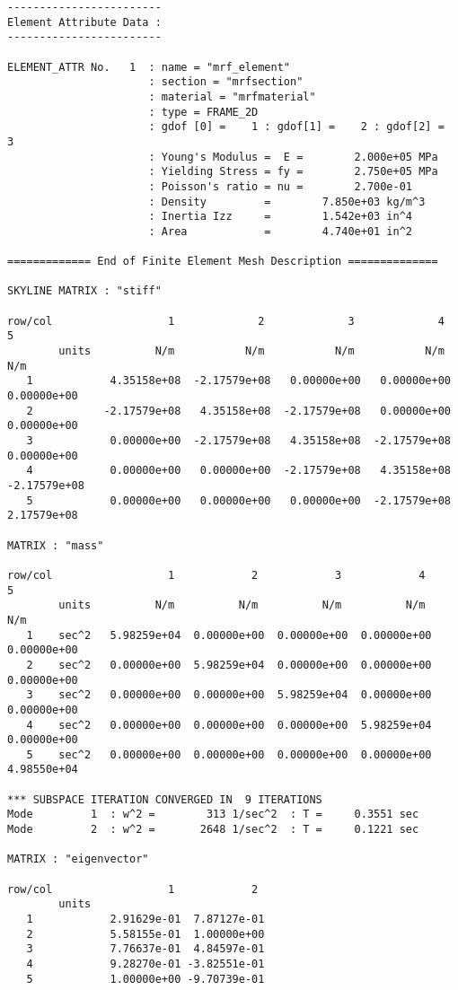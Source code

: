 \begin{footnotesize}
\begin{verbatim}
------------------------ 
Element Attribute Data :        
------------------------ 

ELEMENT_ATTR No.   1  : name = "mrf_element" 
                      : section = "mrfsection" 
                      : material = "mrfmaterial" 
                      : type = FRAME_2D
                      : gdof [0] =    1 : gdof[1] =    2 : gdof[2] =    3
                      : Young's Modulus =  E =        2.000e+05 MPa
                      : Yielding Stress = fy =        2.750e+05 MPa
                      : Poisson's ratio = nu =        2.700e-01   
                      : Density         =        7.850e+03 kg/m^3
                      : Inertia Izz     =        1.542e+03 in^4
                      : Area            =        4.740e+01 in^2

============= End of Finite Element Mesh Description ==============

SKYLINE MATRIX : "stiff"

row/col                  1             2             3             4             5   
        units          N/m           N/m           N/m           N/m           N/m   
   1            4.35158e+08  -2.17579e+08   0.00000e+00   0.00000e+00   0.00000e+00 
   2           -2.17579e+08   4.35158e+08  -2.17579e+08   0.00000e+00   0.00000e+00 
   3            0.00000e+00  -2.17579e+08   4.35158e+08  -2.17579e+08   0.00000e+00 
   4            0.00000e+00   0.00000e+00  -2.17579e+08   4.35158e+08  -2.17579e+08 
   5            0.00000e+00   0.00000e+00   0.00000e+00  -2.17579e+08   2.17579e+08 

MATRIX : "mass"

row/col                  1            2            3            4            5   
        units          N/m          N/m          N/m          N/m          N/m   
   1    sec^2   5.98259e+04  0.00000e+00  0.00000e+00  0.00000e+00  0.00000e+00
   2    sec^2   0.00000e+00  5.98259e+04  0.00000e+00  0.00000e+00  0.00000e+00
   3    sec^2   0.00000e+00  0.00000e+00  5.98259e+04  0.00000e+00  0.00000e+00
   4    sec^2   0.00000e+00  0.00000e+00  0.00000e+00  5.98259e+04  0.00000e+00
   5    sec^2   0.00000e+00  0.00000e+00  0.00000e+00  0.00000e+00  4.98550e+04

*** SUBSPACE ITERATION CONVERGED IN  9 ITERATIONS 
Mode         1  : w^2 =        313 1/sec^2  : T =     0.3551 sec 
Mode         2  : w^2 =       2648 1/sec^2  : T =     0.1221 sec 

MATRIX : "eigenvector"

row/col                  1            2   
        units                             
   1            2.91629e-01  7.87127e-01
   2            5.58155e-01  1.00000e+00
   3            7.76637e-01  4.84597e-01
   4            9.28270e-01 -3.82551e-01
   5            1.00000e+00 -9.70739e-01


\end{verbatim}
\end{footnotesize}
